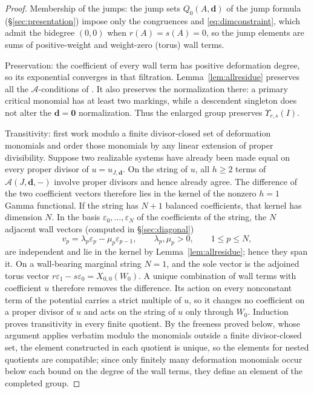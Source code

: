 \documentclass[11pt]{amsart}
\theoremstyle{definition}
\theoremstyle{remark}
\newcommand{\Ascr}{\mathcal{A}}
\begin{document}
\begin{proof}
Membership of the jumps: the jump sets $Q_{0}(A,\mathbf d)$ of the jump
formula (\S\ref{sec:presentation}) impose only the congruences and
\eqref{eq:dimconstraint}, which admit the bidegree $(0,0)$ when
$r(A)=s(A)=0$, so the jump elements are sums of positive-weight and
weight-zero (torus) wall terms.

Preservation: the coefficient of every wall term has positive deformation
degree, so its exponential converges in that filtration.  Lemma~\ref{lem:allresidue}
preserves all the $\Ascr$-conditions of \cite[Def.~3.47]{GKT}.  It also
preserves the normalization there: a primary critical monomial has at least
two markings, while a descendent singleton does not alter the
$\mathbf d=\mathbf0$ normalization.  Thus the enlarged group preserves
$\Upsilon_{r,s}(I)$.

Transitivity: first work modulo a finite divisor-closed set of deformation
monomials and order those monomials by any linear extension of proper
divisibility.  Suppose two realizable systems have already been made equal on
every proper divisor of $u=u_{J,\mathbf d}$.  On the string of $u$, all
$h\ge2$ terms of $\Ascr(J,\mathbf d,-)$ involve proper divisors and hence
already agree.  The difference of the two coefficient vectors therefore lies
in the kernel of the nonzero $h=1$ Gamma functional.  If the string has
$N+1$ balanced coefficients, that kernel has dimension $N$.  In the basis
$\varepsilon_0,\dots,\varepsilon_N$ of the coefficients of the string, the $N$
adjacent wall vectors (computed in \S\ref{sec:diagonal})
\[
 v_p=\lambda_p\varepsilon_p-\mu_p\varepsilon_{p-1},\qquad \lambda_p,\mu_p>0,\qquad 1\le p\le N,
\]
are independent and lie in the kernel by Lemma~\ref{lem:allresidue}; hence
they span it.  On a wall-bearing marginal string $N=1$, and the sole vector is the
adjoined torus vector
$r\varepsilon_1-s\varepsilon_0=X_{0,0}(W_0)$.  A unique combination of
wall terms with coefficient $u$ therefore removes the difference.  Its action
on every nonconstant term of the potential carries a strict multiple of $u$, so
it changes no coefficient on a proper divisor of $u$ and acts on the string
of $u$ only through $W_0$.  Induction proves
transitivity in every finite quotient.  By the freeness proved below, whose
argument applies verbatim modulo the monomials outside a finite
divisor-closed set, the element constructed in each quotient is unique, so
the elements for nested quotients are compatible; since only finitely many
deformation monomials occur below each bound on the degree of the wall terms,
they define an element of the completed group.


\end{proof}
\end{document}
